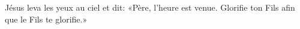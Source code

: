 \encetemps Jésus leva les yeux au ciel et dit:
	«Père, l’heure est venue.
	Glorifie ton Fils afin que le Fils te glorifie.»
